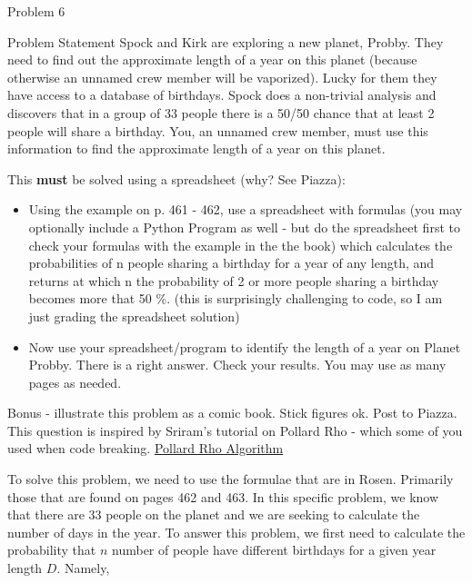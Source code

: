 \begin{problem}{Problem 6}
    \begin{statement}{Problem Statement}
        Spock and Kirk are exploring a new planet, Probby. They need to find out the approximate length of a year on this planet (because otherwise an unnamed crew member will be vaporized). Lucky 
        for them they have access to a database of birthdays. Spock does a non-trivial analysis and discovers that in a group of 33 people there is a 50/50 chance that at least 2 people will share 
        a birthday. You, an unnamed crew member, must use this information to find the approximate length of a year on this planet. \vspace*{1em}

        This \textbf{must} be solved using a spreadsheet (why? See Piazza):

        \begin{itemize}
            \item Using the example on p. 461 - 462, use a spreadsheet with formulas (you may optionally include a Python Program as well - but do the spreadsheet first to check your formulas with 
            the example in the the book) which calculates the probabilities of n people sharing a birthday for a year of any length, and returns at which n the probability of 2 or more people sharing 
            a birthday becomes more that 50 \%. (this is surprisingly challenging to code, so I am just grading the spreadsheet solution)
            \item Now use your spreadsheet/program to identify the length of a year on Planet Probby. There is a right answer. Check your results. You may use as many pages as needed.
        \end{itemize}

        Bonus - illustrate this problem as a comic book. Stick figures ok. Post to Piazza. This question is inspired by Sriram's tutorial on Pollard Rho - which some of you used when code breaking. \href{https://home.cs.colorado.edu/%7Esrirams/courses/csci2824-spr14/pollardsRho.html}{Pollard Rho Algorithm}
    \end{statement}

    \begin{Highlight}[Solution]
        To solve this problem, we need to use the formulae that are in Rosen. Primarily those that are found on pages 462 and 463. In this specific problem, we know that there are 33 people on the planet
        and we are seeking to calculate the number of days in the year. To answer this problem, we first need to calculate the probability that $n$ number of people have different birthdays for a given 
        year length $D$. Namely,


\end{Highlight}
\end{problem}
